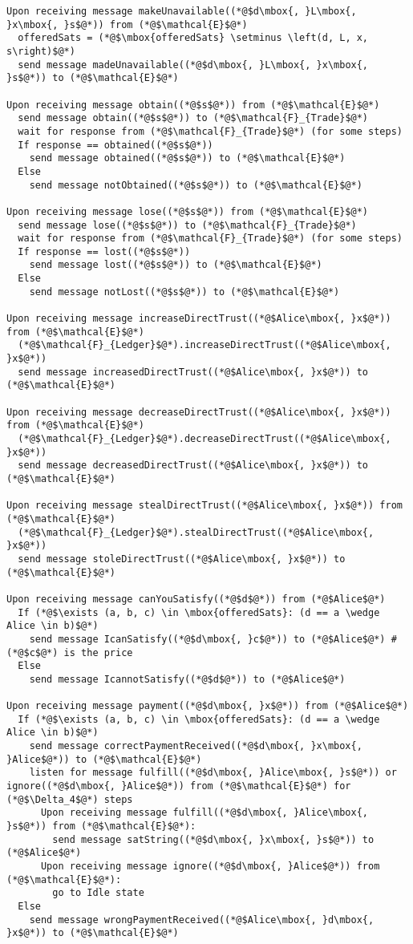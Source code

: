 \begin{lstlisting}[label=protocol, style=numbers]
Upon receiving message makeUnavailable((*@$d\mbox{, }L\mbox{, }x\mbox{, }s$@*)) from (*@$\mathcal{E}$@*)
  offeredSats = (*@$\mbox{offeredSats} \setminus \left(d, L, x, s\right)$@*)
  send message madeUnavailable((*@$d\mbox{, }L\mbox{, }x\mbox{, }s$@*)) to (*@$\mathcal{E}$@*)

Upon receiving message obtain((*@$s$@*)) from (*@$\mathcal{E}$@*)
  send message obtain((*@$s$@*)) to (*@$\mathcal{F}_{Trade}$@*)
  wait for response from (*@$\mathcal{F}_{Trade}$@*) (for some steps)
  If response == obtained((*@$s$@*))
    send message obtained((*@$s$@*)) to (*@$\mathcal{E}$@*)
  Else
    send message notObtained((*@$s$@*)) to (*@$\mathcal{E}$@*)

Upon receiving message lose((*@$s$@*)) from (*@$\mathcal{E}$@*)
  send message lose((*@$s$@*)) to (*@$\mathcal{F}_{Trade}$@*)
  wait for response from (*@$\mathcal{F}_{Trade}$@*) (for some steps)
  If response == lost((*@$s$@*))
    send message lost((*@$s$@*)) to (*@$\mathcal{E}$@*)
  Else
    send message notLost((*@$s$@*)) to (*@$\mathcal{E}$@*)

Upon receiving message increaseDirectTrust((*@$Alice\mbox{, }x$@*)) from (*@$\mathcal{E}$@*)
  (*@$\mathcal{F}_{Ledger}$@*).increaseDirectTrust((*@$Alice\mbox{, }x$@*))
  send message increasedDirectTrust((*@$Alice\mbox{, }x$@*)) to (*@$\mathcal{E}$@*)

Upon receiving message decreaseDirectTrust((*@$Alice\mbox{, }x$@*)) from (*@$\mathcal{E}$@*)
  (*@$\mathcal{F}_{Ledger}$@*).decreaseDirectTrust((*@$Alice\mbox{, }x$@*))
  send message decreasedDirectTrust((*@$Alice\mbox{, }x$@*)) to (*@$\mathcal{E}$@*)

Upon receiving message stealDirectTrust((*@$Alice\mbox{, }x$@*)) from (*@$\mathcal{E}$@*)
  (*@$\mathcal{F}_{Ledger}$@*).stealDirectTrust((*@$Alice\mbox{, }x$@*))
  send message stoleDirectTrust((*@$Alice\mbox{, }x$@*)) to (*@$\mathcal{E}$@*)

Upon receiving message canYouSatisfy((*@$d$@*)) from (*@$Alice$@*)
  If (*@$\exists (a, b, c) \in \mbox{offeredSats}: (d == a \wedge Alice \in b)$@*)
    send message IcanSatisfy((*@$d\mbox{, }c$@*)) to (*@$Alice$@*) # (*@$c$@*) is the price
  Else
    send message IcannotSatisfy((*@$d$@*)) to (*@$Alice$@*)

Upon receiving message payment((*@$d\mbox{, }x$@*)) from (*@$Alice$@*)
  If (*@$\exists (a, b, c) \in \mbox{offeredSats}: (d == a \wedge Alice \in b)$@*)
    send message correctPaymentReceived((*@$d\mbox{, }x\mbox{, }Alice$@*)) to (*@$\mathcal{E}$@*)
    listen for message fulfill((*@$d\mbox{, }Alice\mbox{, }s$@*)) or ignore((*@$d\mbox{, }Alice$@*)) from (*@$\mathcal{E}$@*) for (*@$\Delta_4$@*) steps
      Upon receiving message fulfill((*@$d\mbox{, }Alice\mbox{, }s$@*)) from (*@$\mathcal{E}$@*):
        send message satString((*@$d\mbox{, }x\mbox{, }s$@*)) to (*@$Alice$@*)
      Upon receiving message ignore((*@$d\mbox{, }Alice$@*)) from (*@$\mathcal{E}$@*):
        go to Idle state
  Else
    send message wrongPaymentReceived((*@$Alice\mbox{, }d\mbox{, }x$@*)) to (*@$\mathcal{E}$@*)
\end{lstlisting}
